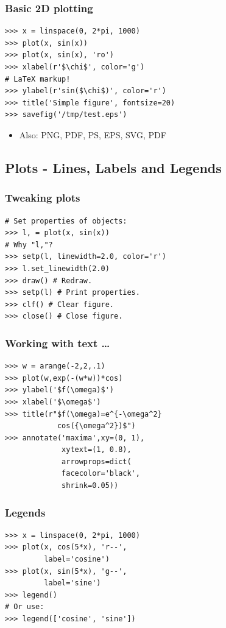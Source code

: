 \documentclass[14pt,compress]{beamer}
\newcounter{time}
\newcommand{\inctime}[1]{\addtocounter{time}{#1}{\tiny \thetime\ m}}
\begin{document}
\begin{frame}[fragile]
    \frametitle{Basic 2D plotting}

\begin{lstlisting}
>>> x = linspace(0, 2*pi, 1000)
>>> plot(x, sin(x)) 
>>> plot(x, sin(x), 'ro')
>>> xlabel(r'$\chi$', color='g')
# LaTeX markup!
>>> ylabel(r'sin($\chi$)', color='r')
>>> title('Simple figure', fontsize=20)
>>> savefig('/tmp/test.eps')
\end{lstlisting}
\begin{itemize}
  \item Also: PNG, PDF, PS, EPS, SVG, PDF
\end{itemize}
\inctime{5}
\end{frame}
       
\subsection{Plots - Lines, Labels and Legends}
\begin{frame}[fragile]
  \frametitle{Tweaking plots}
\begin{lstlisting}
# Set properties of objects:
>>> l, = plot(x, sin(x))
# Why "l,"?
>>> setp(l, linewidth=2.0, color='r')
>>> l.set_linewidth(2.0)
>>> draw() # Redraw.
>>> setp(l) # Print properties.
>>> clf() # Clear figure.
>>> close() # Close figure.
\end{lstlisting}
\end{frame}

\begin{frame}[fragile]
   \frametitle{Working with text \ldots}
\begin{lstlisting}
>>> w = arange(-2,2,.1)
>>> plot(w,exp(-(w*w))*cos)
>>> ylabel('$f(\omega)$')
>>> xlabel('$\omega$')
>>> title(r"$f(\omega)=e^{-\omega^2}
            cos({\omega^2})$")
>>> annotate('maxima',xy=(0, 1), 
             xytext=(1, 0.8), 
             arrowprops=dict(
             facecolor='black', 
             shrink=0.05))
\end{lstlisting}
    
\end{frame}

\begin{frame}[fragile]
  \frametitle{Legends}
\begin{lstlisting}
>>> x = linspace(0, 2*pi, 1000)
>>> plot(x, cos(5*x), 'r--', 
         label='cosine')
>>> plot(x, sin(5*x), 'g--', 
         label='sine')
>>> legend() 
# Or use:
>>> legend(['cosine', 'sine'])
\end{lstlisting}
\end{frame}
\end{document}
